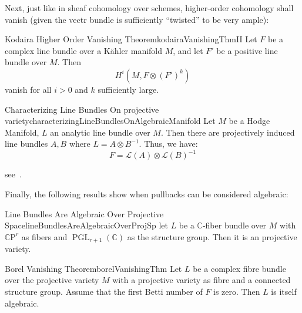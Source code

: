 \documentclass{book}
\newenvironment{Proof}[1][]
  {\begin{ProofTcb}[#1]}
  {\end{ProofTcb}}
\newcommand{\C}{{\mathbb{C}}}
\newcommand{\CL}{{\mathcal{L}}}
\newcommand{\CP}{{\mathbb{C}\mathrm{P}}}
\newcommand{\GL}{{\operatorname{GL}}}
\newcommand{\PGL}{{\operatorname{PGL}}}
\begin{document}
Next, just like in sheaf cohomology over schemes, higher-order cohomology shall vanish (given the vectr bundle
is sufficiently ``twisted'' to be very ample):

\begin{thm}{Kodaira Higher Order Vanishing Theorem}{kodairaVanishingThmII}
  Let $F$ be a complex line bundle over a K\"ahler manifold $M$, and let $F'$ be a positive line bundle over $M$.
  Then
  \[
    H^i(M, F\otimes (F')^k)
  \]
  vanish for all $i > 0$ and $k$ sufficiently large.
\end{thm}

\begin{Proof}
  \cite{voisinHodgeTheoryComplex2002}
\end{Proof}

\begin{thm}{Characterizing Line Bundles On projective variety}{characterizingLineBundlesOnAlgebraicManifold}
  Let $M$ be a Hodge Manifold, $L$ an analytic line bundle over $M$. Then there are projectively induced
  line bundles $A,B$ where $L = A\otimes B^{-1}$. Thus, we have:
  \[
    F = \CL(A)\otimes \CL(B)^{-1}
  \]
\end{thm}

\begin{Proof}
  see~\cite[p.141, thm~18.2.5]{hirzebruchTopologicalMethodsAlgebraic1995}.
\end{Proof}

Finally, the following results show when pullbacks can be considered algebraic:

\begin{thm}{Line Bundles Are Algebraic Over Projective Space}{lineBundlesAreAlgebraicOverProjSp}
  let $L$ be a $\C$-fiber bundle over $M$ with $\CP^r$ as fibers and $\PGL_{r+1}(\C)$ as the structure group.
  Then it is an projective variety.
\end{thm}

\begin{Proof}
\cite{deligneRelevementsModulop2etDecomposition1987}
\end{Proof}




\begin{thm}{Borel Vanishing Theorem}{borelVanishingThm}
  Let $L$ be a complex fibre bundle over the projective variety $M$ with a projective variety as fibre
  and a connected structure group. Assume that the first Betti number of $F$ is zero. Then $L$ is itself
  algebraic.
\end{thm}
\end{document}
